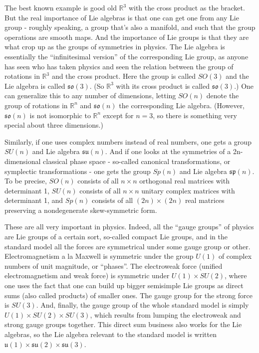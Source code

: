 \documentclass{article}
\begin{document}
The best known example is good old \(\mathbb{R}^3\) with the cross
product as the bracket. But the real importance of Lie algebras is that
one can get one from any Lie group - roughly speaking, a group that's
also a manifold, and such that the group operations are smooth maps. And
the importance of Lie groups is that they are what crop up as the groups
of symmetries in physics. The Lie algebra is essentially the
``infinitesimal version'' of the corresponding Lie group, as anyone has
seen who has taken physics and seen the relation between the group of
rotations in \(\mathbb{R}^3\) and the cross product. Here the group is
called \(SO(3)\) and the Lie algebra is called \(\mathfrak{so}(3)\). (So
\(\mathbb{R}^3\) with its cross product is called \(\mathfrak{so}(3)\).)
One can generalize this to any number of dimensions, letting \(SO(n)\)
denote the group of rotations in \(\mathbb{R}^n\) and
\(\mathfrak{so}(n)\) the corresponding Lie algebra. (However,
\(\mathfrak{so}(n)\) is not isomorphic to \(\mathbb{R}^n\) except for
\(n = 3\), so there is something very special about three dimensions.)

Similarly, if one uses complex numbers instead of real numbers, one gets
a group \(SU(n)\) and Lie algebra \(\mathfrak{su}(n)\). And if one looks
at the symmetries of a 2n-dimensional classical phase space - so-called
canonical transformations, or symplectic transformations - one gets the
group \(Sp(n)\) and Lie algebra \(\mathfrak{sp}(n)\). To be precise,
\(SO(n)\) consists of all \(n\times n\) orthogonal real matrices with
determinant 1, \(SU(n)\) consists of all \(n\times n\) unitary complex
matrices with determinant 1, and \(Sp(n)\) consists of all
\((2n)\times(2n)\) real matrices preserving a nondegenerate
skew-symmetric form.

These are all very important in physics. Indeed, all the ``gauge
groups'' of physics are Lie groups of a certain sort, so-called compact
Lie groups, and in the standard model all the forces are symmetrical
under some gauge group or other. Electromagnetism a la Maxwell is
symmetric under the group \(U(1)\) of complex numbers of unit magnitude,
or ``phases''. The electroweak force (unified electromagnetism and weak
force) is symmetric under \(U(1) \times SU(2)\), where one uses the fact
that one can build up bigger semisimple Lie groups as direct sums (also
called products) of smaller ones. The gauge group for the strong force
is \(SU(3)\). And, finally, the gauge group of the whole standard model
is simply \(U(1) \times SU(2) \times SU(3)\), which results from lumping
the electroweak and strong gauge groups together. This direct sum
business also works for the Lie algebras, so the Lie algebra relevant to
the standard model is written
\(\mathfrak{u}(1) \times \mathfrak{su}(2) \times \mathfrak{su}(3)\).
\end{document}
